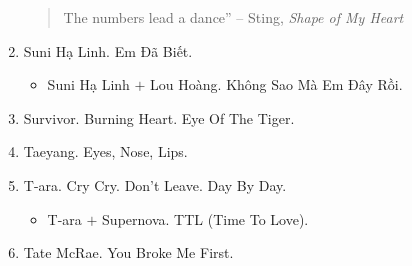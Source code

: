\documentclass{article}
\begin{document}
\begin{enumerate}
\begin{quotation}
		The numbers lead a dance'' -- Sting, {\it Shape of My Heart}
	\end{quotation}
	\item {\sc Suni Hạ Linh.} Em Đã Biết.
	\begin{itemize}
		\item {\sc Suni Hạ Linh $+$ Lou Hoàng.} Không Sao Mà Em Đây Rồi.
	\end{itemize}
	\item {\sc Survivor.} Burning Heart. Eye Of The Tiger.
	\item {\sc Taeyang.} Eyes, Nose, Lips.
	\item {\sc T-ara.} Cry Cry. Don't Leave. Day By Day.
	\begin{itemize}
		\item {\sc T-ara $+$ Supernova.} TTL (Time To Love).
	\end{itemize}
	\item {\sc Tate McRae.} You Broke Me First.

\end{enumerate}
\end{document}
